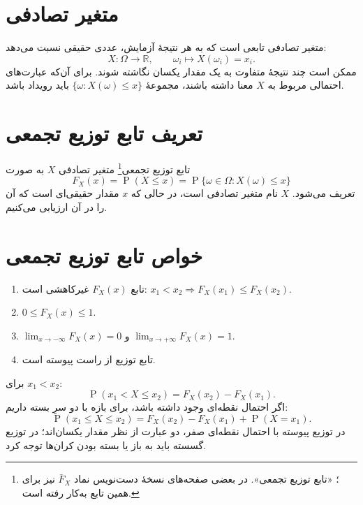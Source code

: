 \documentclass[12pt,a4paper,oneside]{book}
\newcommand{\Prob}{\operatorname{P}}
\newcommand{\R}{\mathbb{R}}
\begin{document}
\section{متغیر تصادفی}
متغیر تصادفی تابعی است که به هر نتیجهٔ آزمایش، عددی حقیقی نسبت می‌دهد:
\begin{equation}X:\Omega\longrightarrow\R,\qquad \omega_i\longmapsto X(\omega_i)=x_i.\end{equation}
ممکن است چند نتیجهٔ متفاوت به یک مقدار یکسان نگاشته شوند. برای آن‌که عبارت‌های احتمالی مربوط به $X$ معنا داشته باشند، مجموعهٔ $\{\omega:X(\omega)\leq x\}$ باید رویداد باشد.

\section{تعریف تابع توزیع تجمعی}
تابع توزیع تجمعی\footnote{؛ «تابع توزیع تجمعی». در بعضی صفحه‌های نسخهٔ دست‌نویس نماد $\bar F_X$ نیز برای همین تابع به‌کار رفته است.} متغیر تصادفی $X$ به صورت
\begin{equation}\label{eq:cdf}
F_X(x)=\Prob(X\leq x)=\Prob\{\omega\in\Omega:X(\omega)\leq x\}
\end{equation}
تعریف می‌شود. $X$ نام متغیر تصادفی است، در حالی که $x$ مقدار حقیقی‌ای است که آن را در آن ارزیابی می‌کنیم.

\section{خواص تابع توزیع تجمعی}
\begin{enumerate}
\item تابع $F_X(x)$ غیرکاهشی است: $x_1<x_2\Rightarrow F_X(x_1)\leq F_X(x_2)$.
\item $0\leq F_X(x)\leq1$.
\item $\lim_{x\to-\infty}F_X(x)=0$ و $\lim_{x\to+\infty}F_X(x)=1$.
\item تابع توزیع از راست پیوسته است.
\end{enumerate}
برای $x_1<x_2$:
\begin{equation}\label{eq:cdf-interval}
\Prob(x_1<X\leq x_2)=F_X(x_2)-F_X(x_1).
\end{equation}
اگر احتمال نقطه‌ای وجود داشته باشد، برای بازه با دو سرِ بسته داریم:
\begin{equation}
\Prob(x_1\leq X\leq x_2)=F_X(x_2)-F_X(x_1)+\Prob(X=x_1).
\end{equation}
در توزیع پیوسته با احتمال نقطه‌ای صفر، دو عبارت از نظر مقدار یکسان‌اند؛ در توزیع گسسته باید به باز یا بسته بودن کران‌ها توجه کرد.
\end{document}
